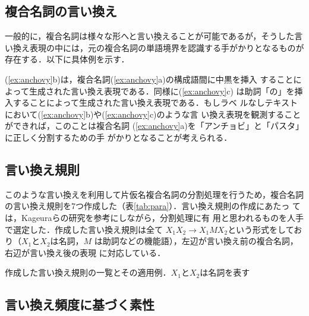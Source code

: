 \documentclass[japanese]{jnlp_1.4}
\begin{document}
\subsection{複合名詞の言い換え}

一般的に，複合名詞は様々な形へと言い換えることが可能であるが，そうした言
い換え表現の中には，元の複合名詞の単語境界を認識する手がかりとなるものが
存在する．以下に具体例を示す．

\begin{lingexample}
\end{lingexample}

\noindent
(\ref{ex:anchovy}b)は，複合名詞(\ref{ex:anchovy}a)の構成語間に中黒を挿入
することによって生成された言い換え表現である．同様に(\ref{ex:anchovy}c)
は助詞「の」を挿入することによって生成された言い換え表現である．もしラベ
ルなしテキストにおいて(\ref{ex:anchovy}b)や(\ref{ex:anchovy}c)のような言
い換え表現を観測することができれば，このことは複合名詞
(\ref{ex:anchovy}a)を「アンチョビ」と「パスタ」に正しく分割するための手
がかりとなることが考えられる．

\subsection{言い換え規則}

このような言い換えを利用して片仮名複合名詞の分割処理を行うため，複合名詞
の言い換え規則を7つ作成した（表\ref{tab:para}）．言い換え規則の作成にあたっ
ては，Kageuraら\citeyear{Kageura04}の研究を参考にしながら，分割処理に有
用と思われるものを人手で選定した．作成した言い換え規則は全て
$X_1X_2\rightarrow X_1MX_2$という形式をしており（$X_1$と$X_2$は名詞，$M$
は助詞などの機能語），左辺が言い換え前の複合名詞，右辺が言い換え後の表現
に対応している．

\begin{table}[b]
\caption{作成した言い換え規則の一覧とその適用例．$X_1$と$X_2$は名詞を表す}
\label{tab:para}

\end{table}



\subsection{言い換え頻度に基づく素性}
\end{document}
